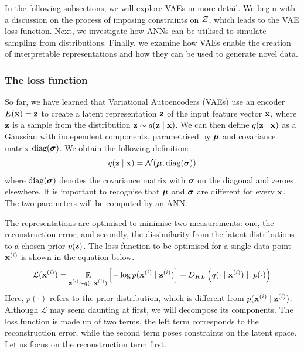 In the following subsections, we will explore VAEs in more detail. We begin with a discussion on the process of imposing constraints on $\mathcal{Z}$, which leads to the VAE loss function. Next, we investigate how ANNs can be utilised to simulate sampling from distributions. Finally, we examine how VAEs enable the creation of interpretable representations and how they can be used to generate novel data.




\subsubsection{The loss function}	

	So far, we have learned that Variational Autoencoders (VAEs) use an encoder $E(\mathbf{x}) = \mathbf{z}$ to create a latent representation $\mathbf{z}$ of the input feature vector $\mathbf{x}$, where $\mathbf{z}$ is a sample from the distribution $\mathbf{z} \sim q (\mathbf{z} \mid \mathbf{x})$. %
	We can then define $q (\mathbf{z} \mid \mathbf{x})$ as a Gaussian with independent components, parametrised by $\bm{\mu}$ and covariance matrix $\text{diag}(\bm{\sigma})$. We obtain the following definition:
	\begin{equation}
		q (\mathbf{z} \mid \mathbf{x}) = \mathcal{N}(\bm{\mu} , \text{diag}(\bm{\sigma})) \label{eq:definition_q}
	\end{equation}
	where $\text{diag}(\bm{\sigma})$ denotes the covariance matrix with $\bm{\sigma}$ on the diagonal and zeroes elsewhere. It is important to recognise that $\bm{\mu}$ and $\bm{\sigma}$ are different for every $\mathbf{x}$. The two parameters will be computed by an ANN.


	The representations are optimised to minimise two measurements: one, the reconstruction error, and secondly, the dissimilarity from the latent distributions to a chosen prior $p(\mathbf{z})$. %
	The loss function to be optimised for a single data point $\mathbf{x}^{(i)}$ is shown in the equation below.
	\begin{equation}
		\mathcal{L} (\mathbf{x}^{(i)}) = \mathop{\mathbb{E}}_{\substack{\mathbf{z}^{(i)} \sim q (\cdot \mid \mathbf{x}^{(i)})}} \left[ -\log p (\mathbf{x}^{(i)} \mid \mathbf{z}^{(i)}) \right] + D_{KL} \left(  q (\cdot \mid \mathbf{x}^{(i)})  \mid \mid  p(\cdot)  \right) \label{eq:elbo_explicit_intial}
	\end{equation} %
	Here, $p(\cdot)$ refers to the prior distribution, which is different from $p (\mathbf{x}^{(i)} \mid \mathbf{z}^{(i)})$.
	Although $\mathcal{L}$ may seem daunting at first, we will decompose its components. The loss function is made up of two terms, the left term corresponds to the reconstruction error, while the second term poses constraints on the latent space. Let us focus on the reconstruction term first.
	
